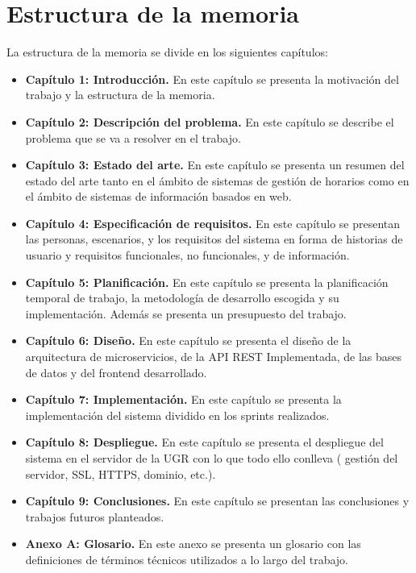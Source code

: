 \section{Estructura de la memoria}

La estructura de la memoria se divide en los siguientes capítulos:

\begin{itemize}
    \item \textbf{Capítulo 1: Introducción.} En este capítulo se presenta la motivación del trabajo y la estructura de la memoria.
    \item \textbf{Capítulo 2: Descripción del problema.} En este capítulo se describe el problema que se va a resolver en el trabajo.
    \item \textbf{Capítulo 3: Estado del arte.} En este capítulo se presenta un resumen del estado del arte tanto en el ámbito de sistemas de gestión de horarios como en el ámbito de sistemas de información basados en web.
    \item \textbf{Capítulo 4: Especificación de requisitos.} En este capítulo se presentan las personas, escenarios, y los requisitos del sistema en forma de historias de usuario y requisitos funcionales, no funcionales, y de información.
    \item \textbf{Capítulo 5: Planificación.} En este capítulo se presenta la planificación temporal de trabajo, la metodología de desarrollo escogida y su implementación. Además se presenta un presupuesto del trabajo.
    \item \textbf{Capítulo 6: Diseño.} En este capítulo se presenta el diseño de la arquitectura de microservicios, de la API REST Implementada, de las bases de datos y del frontend desarrollado.
    \item \textbf{Capítulo 7: Implementación.} En este capítulo se presenta la implementación del sistema dividido en los sprints realizados.
    \item \textbf{Capítulo 8: Despliegue.} En este capítulo se presenta el despliegue del sistema en el servidor de la UGR con lo que todo ello conlleva ( gestión del servidor, SSL, HTTPS, dominio, etc.).
    \item \textbf{Capítulo 9: Conclusiones.} En este capítulo se presentan las conclusiones y trabajos futuros planteados.
    \item \textbf{Anexo A: Glosario.} En este anexo se presenta un glosario con las definiciones de términos técnicos utilizados a lo largo del trabajo.
\end{itemize}